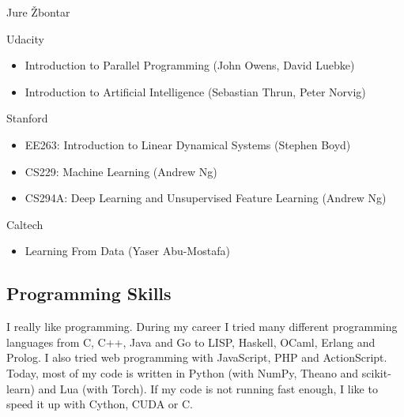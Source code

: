 \documentclass[12pt,a4paper]{article}
\begin{document}
\begin{cv}{Jure \v{Z}bontar}
\begin{cvlist}{}
\item[Udacity] 
\begin{itemize}
\item Introduction to Parallel Programming (John Owens, David Luebke)
\item Introduction to Artificial Intelligence (Sebastian Thrun, Peter Norvig)
\end{itemize}

\item[Stanford] 
\begin{itemize}
\item EE263: Introduction to Linear Dynamical Systems (Stephen Boyd)
\item CS229: Machine Learning (Andrew Ng)
\item CS294A: Deep Learning and Unsupervised Feature Learning (Andrew Ng)
\end{itemize}

\item[Caltech] 
\begin{itemize}
\item Learning From Data (Yaser Abu-Mostafa)
\end{itemize}

\end{cvlist}

\subsection*{Programming Skills}
I really like programming. During my career I tried many different
programming languages from C, C++, Java and Go to LISP, Haskell, OCaml,
Erlang and Prolog. I also tried web programming with JavaScript, PHP and
ActionScript. Today, most of my code is written in Python (with NumPy,
Theano and scikit-learn) and Lua (with Torch). If my code is not running fast enough,
I like to speed it up with Cython, CUDA or C.
\end{cv}

\nocite{vzbontar2014computing,demvsar2013orange,zbontar2012team}
\nocite{ZbontarZZMPZ12}
{}

\end{document}

